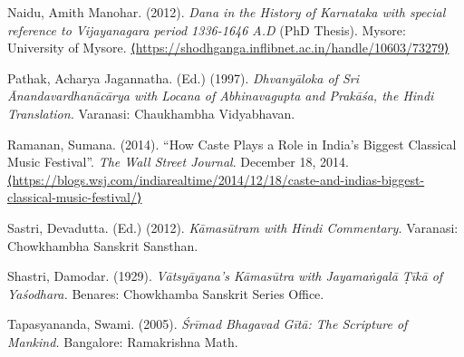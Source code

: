 \begin{thebibliography}{99}
  Naidu, Amith Manohar. (2012). \textit{Dana in the History of Karnataka with special reference to Vijayanagara period 1336-1646 A.D} (PhD Thesis). Mysore: University of Mysore. \url{⟨https://shodhganga.inflibnet.ac.in/handle/10603/73279⟩}

  Pathak, Acharya Jagannatha. (Ed.) (1997). \textit{Dhvanyāloka of Sri Ānandavardhanācārya with Locana of Abhinavagupta and Prakāśa, the Hindi Translation.} Varanasi: Chaukhambha Vidyabhavan.

  Ramanan, Sumana. (2014). “How Caste Plays a Role in India’s Biggest Classical Music Festival”. \textit{The Wall Street Journal}. December 18, 2014. \url{⟨https://blogs.wsj.com/indiarealtime/2014/12/18/caste-and-indias-biggest-classical-music-festival/⟩}

  Sastri, Devadutta. (Ed.) (2012). \textit{Kāmasūtram with Hindi Commentary.} Varanasi: Chowkhambha Sanskrit Sansthan.

  Shastri, Damodar. (1929). \textit{Vātsyāyana’s Kāmasūtra with Jayamaṅgalā Ṭīkā of Yaśodhara.} Benares: Chowkhamba Sanskrit Series Office.

  Tapasyananda, Swami. (2005). \textit{Śrīmad Bhagavad Gītā: The Scripture of Mankind.} Bangalore: Ramakrishna Math.

 \end{thebibliography}

\theendnotes

